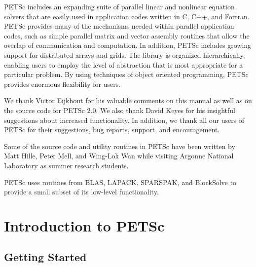   PETSc includes an expanding suite of parallel linear and nonlinear
equation solvers that are easily used in application codes written in
C, C++, and Fortran.  PETSc provides many of the mechanisms needed
within parallel application codes, such as simple parallel matrix and
vector assembly routines that allow the overlap of communication and
computation.  In addition, PETSc includes growing support for
distributed arrays and grids.  The library is organized
hierarchically, enabling users to employ the level of abstraction that
is most appropriate for a particular problem. By using techniques 
of object oriented programming, PETSc provides enormous flexibility 
for users.

\vspace{1in}


\medskip \medskip 
We thank Victor Eijkhout for his valuable comments on this
manual as well as on the source code for PETSc 2.0.  We also thank David
Keyes for his insightful suggestions about increased functionality.
In addition, we thank all our users  of PETSc for
their suggestions, bug reports, support, and encouragement.

\vspace{.3in}
Some of the source code and utility routines in PETSc have been 
written by Matt Hille, Peter Mell, and Wing-Lok Wan while visiting 
Argonne National Laboratory as summer research students.

\vspace{.3in}
PETSc uses routines from BLAS, LAPACK, SPARSPAK, and BlockSolve to
provide a small subset of its low-level functionality.

\setcounter{page}{3}
\tableofcontents
\clearpage
{}


\part{Introduction to PETSc}
\label{part:intro}
\chapter{Getting Started}


